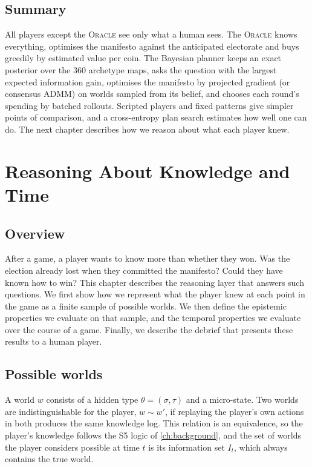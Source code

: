 \documentclass[11pt,a4paper,oneside]{report}
\newcommand{\ORACLE}{\textsc{Oracle}}
\newcommand{\overviewsection}{\section{Overview}}
\newcommand{\summarysection}{\section{Summary}}
\begin{document}
\summarysection

All players except the \ORACLE{} see only what a human sees. The \ORACLE{} knows everything, optimises the
manifesto against the anticipated electorate and buys greedily by estimated value per coin. The Bayesian
planner keeps an exact posterior over the 360 archetype maps, asks the question with the largest expected
information gain, optimises the manifesto by projected gradient (or consensus ADMM) on worlds sampled from
its belief, and chooses each round's spending by batched rollouts. Scripted players and fixed patterns give
simpler points of comparison, and a cross-entropy plan search estimates how well one can do. The next
chapter describes how we reason about what each player knew.

\chapter{Reasoning About Knowledge and Time}\label{ch:logic}

\overviewsection

After a game, a player wants to know more than whether they won. Was the election already lost when they
committed the manifesto? Could they have known how to win? This chapter describes the reasoning layer that
answers such questions. We first show how we represent what the player knew at each point in the game as a
finite sample of possible worlds. We then define the epistemic properties we evaluate on that sample, and
the temporal properties we evaluate over the course of a game. Finally, we describe the debrief that
presents these results to a human player.

\section{Possible worlds}

A world $w$ consists of a hidden type $\theta=(\sigma,\tau)$ and a micro-state. Two worlds are
indistinguishable for the player, $w \sim w'$, if replaying the player's own actions in both produces the
same knowledge log. This relation is an equivalence, so the player's knowledge follows the S5 logic of
\cref{ch:background}, and the set of worlds the player considers possible at time $t$ is its information
set $I_t$, which always contains the true world.
\end{document}
